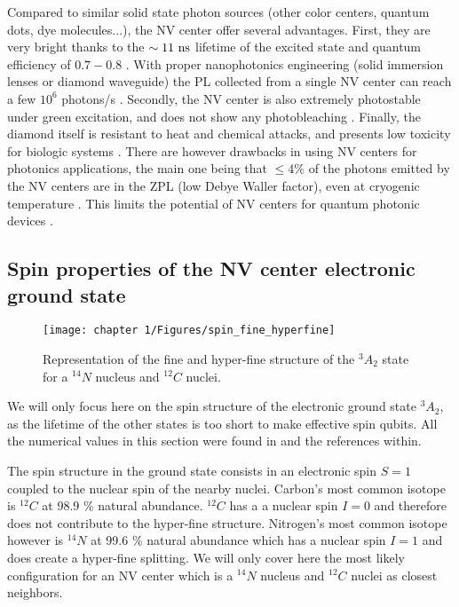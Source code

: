 \documentclass[a4paper, 11pt]{book}
\begin{document}
\medskip
Compared to similar solid state photon sources (other color centers, quantum dots, dye molecules...), the NV center offer several advantages. First, they are very bright thanks to the $\sim 11\ \rm ns$ lifetime of the excited state and quantum efficiency of $0.7-0.8$ \citep{schirhagl2014nitrogen}. With proper nanophotonics engineering (solid immersion lenses or diamond waveguide) the PL collected from a single NV center can reach a few $10^6$ photons/s \citep{schroder2016quantum}.  Secondly, the NV center is also extremely photostable under green excitation, and does not show any photobleaching \citep{brouri2000photon}. Finally, the diamond itself is resistant to heat and chemical attacks, and presents low toxicity for biologic systems \citep{fu2007characterization}. There are however drawbacks in using NV centers for photonics applications, the main one being that $\leq 4\%$ of the photons emitted by the NV centers are in the ZPL (low Debye Waller factor), even at cryogenic temperature \citep{johnson2015tunable}. This limits the potential of NV centers for quantum photonic devices \citep{bradac2019quantum}.

\subsection{Spin properties of the NV center electronic ground state}
\begin{figure}[h!]
\centering
\texttt{[image: chapter 1/Figures/spin\_fine\_hyperfine]}
\caption{Representation of the fine and hyper-fine structure of the $^3A_2$ state for a $^{14}N$ nucleus and $^{12}C$ nuclei.}
\label{NV spin}
\end{figure}

We will only focus here on the spin structure of the electronic ground state $^3A_2$, as the lifetime of the other states is too short to make effective spin qubits. All the numerical values in this section were found in \citep{smeltzer2009robust, doherty2013nitrogen} and the references within.

The spin structure in the ground state consists in an electronic spin $S=1$ coupled to the nuclear spin of the nearby nuclei. Carbon's most common isotope is $^{12}C$ at 98.9 \% natural abundance. $^{12}C$ has a a nuclear spin $I=0$ and therefore does not contribute to the hyper-fine structure. Nitrogen's most common isotope however is $^{14}N$ at 99.6 \% natural abundance which has a nuclear spin $I=1$ and does create a hyper-fine splitting. We will only cover here the most likely configuration for an NV center which is a $^{14}N$ nucleus and $^{12}C$ nuclei as closest neighbors. 
\end{document}
